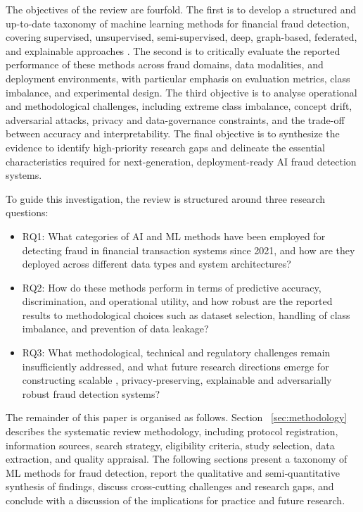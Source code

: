 \documentclass[a4paper,fleqn]{cas-dc}
\begin{document}
The objectives of the review are fourfold. 
The first is to develop a structured and up-to-date taxonomy of machine learning methods for financial fraud detection, covering supervised, unsupervised, semi-supervised, deep, graph-based, federated, and explainable approaches \cite{blaszczynski_auto_2021}. 
The second is to critically evaluate the reported performance of these methods across fraud domains, data modalities, and deployment environments, with particular emphasis on evaluation metrics, class imbalance, and experimental design. 
The third objective is to analyse operational and methodological challenges, including extreme class imbalance, concept drift, adversarial attacks, privacy and data-governance constraints, and the trade-off between accuracy and interpretability. 
The final objective is to synthesize the evidence to identify high-priority research gaps and delineate the essential characteristics required for next-generation, deployment-ready AI fraud detection systems.

To guide this investigation, the review is structured around three research questions:
\begin{itemize}
\item RQ1: What categories of AI and ML methods have been employed for detecting fraud in financial transaction systems since 2021, and how are they deployed across different data types and system architectures?
\item RQ2: How do these methods perform in terms of predictive accuracy, discrimination, and operational utility, and how robust are the reported results to methodological choices such as dataset selection, handling of class imbalance, and prevention of data leakage?
\item RQ3: What methodological, technical and regulatory challenges remain insufficiently addressed, and what future research directions emerge for constructing scalable \cite{mill_opportunities_2023, sarna_ai_2025}, privacy‑preserving, explainable and adversarially robust fraud detection systems?
\end{itemize}
The remainder of this paper is organised as follows. Section ~\ref{sec:methodology} describes the systematic review methodology, including protocol registration, information sources, search strategy, eligibility criteria, study selection, data extraction, and quality appraisal. The following sections present a taxonomy of ML methods for fraud detection, report the qualitative and semi‑quantitative synthesis of findings, discuss cross‑cutting challenges and research gaps, and conclude with a discussion of the implications for practice and future research.
\end{document}
